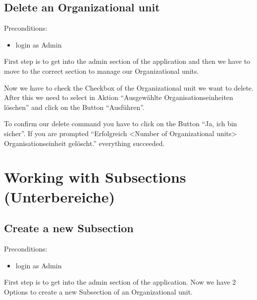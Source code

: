 \documentclass[letterpaper,10pt,english]{sphinxmanual}
\begin{document}
\subsection{Delete an Organizational unit}
\label{\detokenize{masterUserDoc:delete-an-organizational-unit}}
Pre\sphinxhyphen{}conditions:
\begin{itemize}
\item {} 
login as Admin

\end{itemize}

First step is to get into the admin section of the application and
then we have to move to the correct section to manage our Organizational units.

\noindent{}

Now we have to check the Checkbox of the Organizational unit we want to delete.
After this we need to select in Aktion “Ausgewählte Organisationseinheiten löschen”
and click on the Button “Ausführen”.

\noindent{}

To confirm our delete command you have to click on the Button “Ja, ich bin sicher”.
If you are prompted “Erfolgreich \textless{}Number of Organizational units\textgreater{} Organisationseinheit gelöscht.”
everything succeeded.


\section{Working with Subsections (Unterbereiche)}
\label{\detokenize{masterUserDoc:working-with-subsections-unterbereiche}}

\subsection{Create a new Subsection}
\label{\detokenize{masterUserDoc:create-a-new-subsection}}
Pre\sphinxhyphen{}conditions:
\begin{itemize}
\item {} 
login as Admin

\end{itemize}

First step is to get into the admin section of the application.
Now we have 2 Options to create a new Subsection of an Organizational unit.

\noindent{}
\end{document}
